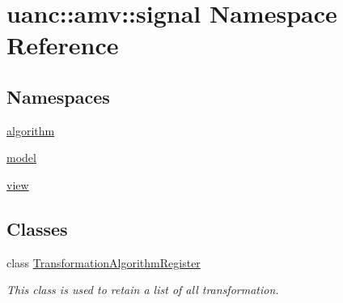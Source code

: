 \hypertarget{namespaceuanc_1_1amv_1_1signal}{}\section{uanc\+:\+:amv\+:\+:signal Namespace Reference}
\label{namespaceuanc_1_1amv_1_1signal}
\subsection*{Namespaces}
\begin{DoxyCompactItemize}
\item 
 \hyperlink{namespaceuanc_1_1amv_1_1signal_1_1algorithm}{algorithm}
\item 
 \hyperlink{namespaceuanc_1_1amv_1_1signal_1_1model}{model}
\item 
 \hyperlink{namespaceuanc_1_1amv_1_1signal_1_1view}{view}
\end{DoxyCompactItemize}
\subsection*{Classes}
\begin{DoxyCompactItemize}
\item 
class \hyperlink{classuanc_1_1amv_1_1signal_1_1_transformation_algorithm_register}{Transformation\+Algorithm\+Register}
\begin{DoxyCompactList}\small\item\em This class is used to retain a list of all transformation. \end{DoxyCompactList}\end{DoxyCompactItemize}
